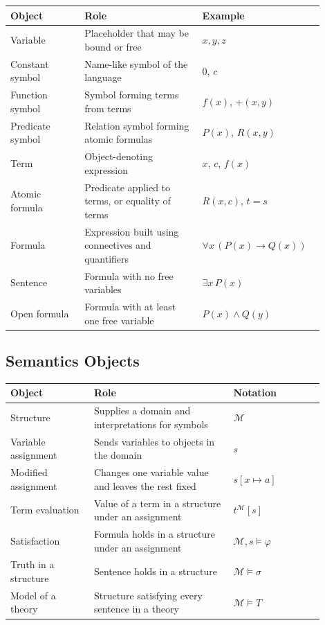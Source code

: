 \begin{center}
\renewcommand{\arraystretch}{1.25}
\begin{tabular}{p{0.22\linewidth} p{0.35\linewidth} p{0.33\linewidth}}
\toprule
\textbf{Object} & \textbf{Role} & \textbf{Example} \\
\midrule
Variable & Placeholder that may be bound or free & $x,y,z$ \\
Constant symbol & Name-like symbol of the language & $0$, $c$ \\
Function symbol & Symbol forming terms from terms & $f(x)$, $+(x,y)$ \\
Predicate symbol & Relation symbol forming atomic formulas & $P(x)$, $R(x,y)$ \\
Term & Object-denoting expression & $x$, $c$, $f(x)$ \\
Atomic formula & Predicate applied to terms, or equality of terms & $R(x,c)$, $t=s$ \\
Formula & Expression built using connectives and quantifiers & $\forall x\,(P(x)\rightarrow Q(x))$ \\
Sentence & Formula with no free variables & $\exists x\,P(x)$ \\
Open formula & Formula with at least one free variable & $P(x)\wedge Q(y)$ \\
\bottomrule
\end{tabular}
\end{center}

\subsection*{Semantics Objects}

\begin{center}
\renewcommand{\arraystretch}{1.25}
\begin{tabular}{p{0.24\linewidth} p{0.40\linewidth} p{0.26\linewidth}}
\toprule
\textbf{Object} & \textbf{Role} & \textbf{Notation} \\
\midrule
Structure & Supplies a domain and interpretations for symbols & $\mathcal M$ \\
Variable assignment & Sends variables to objects in the domain & $s$ \\
Modified assignment & Changes one variable value and leaves the rest fixed & $s[x\mapsto a]$ \\
Term evaluation & Value of a term in a structure under an assignment & $t^{\mathcal M}[s]$ \\
Satisfaction & Formula holds in a structure under an assignment & $\mathcal M,s\models\varphi$ \\
Truth in a structure & Sentence holds in a structure & $\mathcal M\models\sigma$ \\
Model of a theory & Structure satisfying every sentence in a theory & $\mathcal M\models T$ \\
\bottomrule
\end{tabular}
\end{center}

